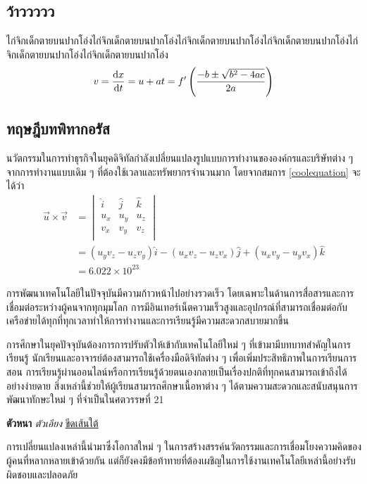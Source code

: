 \documentclass[11pt, oneside]{book}
\begin{document}
\subsection{ว้าววววว}

ไก่จิกเด็กตายบนปากโอ่งไก่จิกเด็กตายบนปากโอ่งไก่จิกเด็กตายบนปากโอ่งไก่จิกเด็กตายบนปากโอ่งไก่จิกเด็กตายบนปากโอ่งไก่จิกเด็กตายบนปากโอ่ง
\begin{equation}
    v = \odv{x}{t} = u + at = f'\left(\frac{-b \pm \sqrt{b^2 - 4ac}}{2a}\right) \label{coolequation}
\end{equation}

\subsection{ทฤษฎีบทพิทากอรัส}

นวัตกรรมในการทำธุรกิจในยุคดิจิทัลกำลังเปลี่ยนแปลงรูปแบบการทำงานขององค์กรและบริษัทต่าง ๆ จากการทำงานแบบเดิม ๆ ที่ต้องใช้เวลาและทรัพยากรจำนวนมาก โดยจากสมการ \ref{coolequation} จะได้ว่า
\begin{align*}
    \vec{u} \times \vec{v} &= 
    \begin{vmatrix} 
        \hat{i} & \hat{j} & \hat{k} \\  
        u_x & u_y & u_z \\
        v_x & v_y & v_z \\
    \end{vmatrix} \\
    &= (u_yv_z - u_zv_y)\hat{i} - (u_xv_z - u_zv_x)\hat{j} + (u_xv_y - u_yv_x)\hat{k} \\
    &= 6.022 \times 10^{23}
\end{align*}

การพัฒนาเทคโนโลยีในปัจจุบันมีความก้าวหน้าไปอย่างรวดเร็ว โดยเฉพาะในด้านการสื่อสารและการเชื่อมต่อระหว่างผู้คนจากทุกมุมโลก การมีอินเทอร์เน็ตความเร็วสูงและอุปกรณ์ที่สามารถเชื่อมต่อกับเครือข่ายได้ทุกที่ทุกเวลาทำให้การทำงานและการเรียนรู้มีความสะดวกสบายมากขึ้น

การศึกษาในยุคปัจจุบันต้องการการปรับตัวให้เข้ากับเทคโนโลยีใหม่ ๆ ที่เข้ามามีบทบาทสำคัญในการเรียนรู้ นักเรียนและอาจารย์ต้องสามารถใช้เครื่องมือดิจิทัลต่าง ๆ เพื่อเพิ่มประสิทธิภาพในการเรียนการสอน การเรียนรู้ผ่านออนไลน์หรือการเรียนรู้ด้วยตนเองกลายเป็นเรื่องปกติที่ทุกคนสามารถเข้าถึงได้อย่างง่ายดาย สิ่งเหล่านี้ช่วยให้ผู้เรียนสามารถศึกษาเนื้อหาต่าง ๆ ได้ตามความสะดวกและสนับสนุนการพัฒนาทักษะใหม่ ๆ ที่จำเป็นในศตวรรษที่ 21
\begin{center}
    \textbf{ตัวหนา} \textit{ตัวเอียง} \underline{ขีดเส้นใต้}
\end{center}
การเปลี่ยนแปลงเหล่านี้นำมาซึ่งโอกาสใหม่ ๆ ในการสร้างสรรค์นวัตกรรมและการเชื่อมโยงความคิดของผู้คนที่หลากหลายเข้าด้วยกัน แต่ก็ยังคงมีข้อท้าทายที่ต้องเผชิญในการใช้งานเทคโนโลยีเหล่านี้อย่างรับผิดชอบและปลอดภัย
\end{document}
